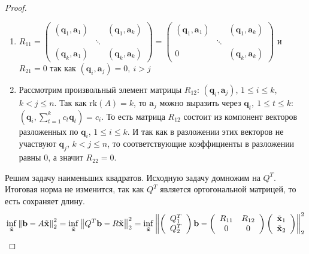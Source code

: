 \begin{proof}
  \begin{enumerate}
    \item $R_{11}=\left(\begin{array}{ccc}
                (\mathbf{q}_1,\mathbf{a}_1) &        & (\mathbf{q}_1,\mathbf{a}_k) \\
                                            & \ddots &                             \\
                (\mathbf{q}_k,\mathbf{a}_1) &        & (\mathbf{q}_k,\mathbf{a}_k)
              \end{array}\right) = \left(\begin{array}{ccc}
                (\mathbf{q}_1,\mathbf{a}_1) &        & (\mathbf{q}_1,\mathbf{a}_k) \\
                                            & \ddots &                             \\
                0                           &        & (\mathbf{q}_k,\mathbf{a}_k)
              \end{array}\right)$ и $R_{21}=0$ так как $(\mathbf{q}_i,\mathbf{a}_j)=0,\ i > j$
    \item Рассмотрим произвольный элемент матрицы $R_{12}$: $(\mathbf{q}_i,\mathbf{a}_j)$,
          $1 \leq i \leq k$, $k < j \leq n$. Так как $\text{rk}(A)=k$, то $\mathbf{a}_j$
          можно выразить через $\mathbf{q}_t,\ 1 \leq t \leq k$: $\left(\mathbf{q}_i,\sum_{t=1}^{k}c_{t}\mathbf{q}_t\right)=c_i$.
          То есть матрица $R_{12}$ состоит из компонент векторов разложенных по $\mathbf{q}_i$, $1 \leq i \leq k$.
          И так как в разложении этих векторов не участвуют $\mathbf{q}_j$, $k < j \leq n$,
          то соответствующие коэффициенты в разложении равны $0$, а значит $R_{22}=0$.
  \end{enumerate}
  Решим задачу наименьших квадратов. Исходную задачу домножим на $Q^T$. Итоговая норма
  не изменится, так как $Q^T$ является ортогональной матрицей, то есть сохраняет длину.
  \[\inf_{\tilde{\mathbf{x}}}\left\lVert\mathbf{b}-A\tilde{\mathbf{x}}\right\rVert_2^2
    =\inf_{\tilde{\mathbf{x}}}\left\lVert Q^T\mathbf{b}-R\tilde{\mathbf{x}}\right\rVert_2^2
    =\inf_{\tilde{\mathbf{x}}}\left\lVert\left(\begin{array}{c} Q_1^T \\ Q_2^T \end{array}\right)\mathbf{b}-\left(\begin{array}{cc} R_{11} & R_{12} \\ 0 & 0 \end{array}\right)\left(\begin{array}{c}\tilde{\mathbf{x}}_1 \\ \tilde{\mathbf{x}}_2\end{array}\right)\right\rVert_2^2\]

\end{proof}
